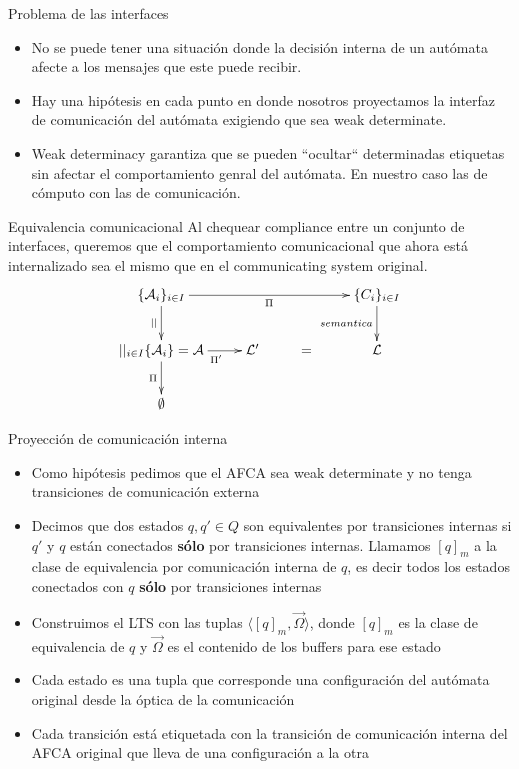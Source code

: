 \documentclass[10pt,xcolor={table,dvipsnames},t]{beamer}
\begin{document}
\begin{frame}{Problema de las interfaces}
\begin{itemize}
\item No se puede tener una situación donde la decisión interna de un autómata afecte a los mensajes que este puede recibir.
\item Hay una hipótesis en cada punto en donde nosotros proyectamos la interfaz de comunicación del autómata exigiendo que sea weak determinate.
\item Weak determinacy \cite{milner89} garantiza que se pueden ``ocultar`` determinadas etiquetas sin afectar el comportamiento genral del autómata. En nuestro caso las de cómputo con las de comunicación.
\end{itemize} 
\vspace{\fill}
\end{frame}

\begin{frame}{Equivalencia comunicacional}
 \vspace{\fill}
Al chequear compliance entre un conjunto de interfaces, queremos que el comportamiento comunicacional que ahora está internalizado sea el mismo que en el communicating system original. 
$$
\xymatrix{   
	\{\mathcal{A}_i\}_{i \in I} \ar[rrr]_{\Pi} \ar[d]_{||} & & & \{C_i\}_{i \in I}  \ar[d]_{semantica}  \\
	  {||_{i \in I}\{\mathcal{A}_i\}= \mathcal{A}} \ar[r]_{\ \ \ \ \Pi'} \ar[d]_{\Pi} & \mathcal{L}' & = & {\mathcal{L}}  \\
	  \emptyset
}
$$
 \vspace{\fill}
\end{frame}

\begin{frame}{Proyección de comunicación interna}
 \vspace{\fill}
\begin{itemize}
    \item Como hipótesis pedimos que el AFCA sea weak determinate y no tenga transiciones de comunicación externa
    \item Decimos que dos estados $q, q' \in Q$ son equivalentes por transiciones internas si $q'$ y $q$ están conectados \textbf{sólo} por transiciones internas. Llamamos $[q]_m$ a la clase de equivalencia por comunicación interna de $q$, es decir todos los estados conectados con $q$ \textbf{sólo} por transiciones internas 
    \item Construimos el LTS con las tuplas $\langle [q]_m, \overrightarrow{\Omega} \rangle$, donde $[q]_m$ es la clase de equivalencia de $q$ y $\overrightarrow{\Omega}$ es el contenido de los buffers para ese estado
    \item Cada estado es una tupla que corresponde una configuración del autómata original desde la óptica de la comunicación
    \item Cada transición está etiquetada con la transición de comunicación interna del AFCA original que lleva de una configuración a la otra
\end{itemize}
 \vspace{\fill}

\end{frame}
\end{document}
